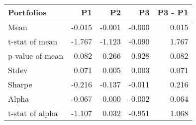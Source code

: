 \begin{tabular}{lrrrr}
\toprule
Portfolios & P1 & P2 & P3 & P3 - P1 \\
\midrule
Mean & -0.015 & -0.001 & -0.000 & 0.015 \\
t-stat of mean & -1.767 & -1.123 & -0.090 & 1.767 \\
p-value of mean & 0.082 & 0.266 & 0.928 & 0.082 \\
Stdev & 0.071 & 0.005 & 0.003 & 0.071 \\
Sharpe & -0.216 & -0.137 & -0.011 & 0.216 \\
Alpha & -0.067 & 0.000 & -0.002 & 0.064 \\
t-stat of alpha & -1.107 & 0.032 & -0.951 & 1.068 \\
\bottomrule
\end{tabular}
